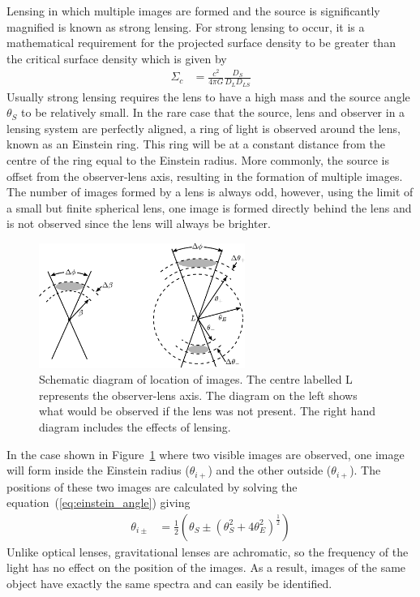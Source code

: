 		Lensing in which multiple images are formed and the source is significantly magnified is known as strong lensing. For strong lensing to occur, it is a mathematical requirement for the projected surface density to be greater than the critical surface density which is given by\cite{Critical_surface_density}
		\begin{align}
			\Sigma_c &= \frac{c^2}{4\pi G}\frac{D_S}{D_L D_{LS}}
		\end{align}
		Usually strong lensing requires the lens to have a high mass and the source angle $\theta_S$ to be relatively small. In the rare case that the source, lens and observer in a lensing system are perfectly aligned, a ring of light is observed around the lens, known as an Einstein ring. This ring will be at a constant distance from the centre of the ring equal to the Einstein radius. More commonly, the source is offset from the observer-lens axis, resulting in the formation of multiple images. The number of images formed by a lens is always odd, however, using the limit of a small but finite spherical lens, one image is formed directly behind the lens and is not observed since the lens will always be brighter.
		\begin{figure}[!htbp]
			\centering
				\includegraphics[width=0.6\textwidth]{../Images/Lensing_image_positions2.pdf}
				\caption[Schematic diagram of location of images]{Schematic diagram of location of images. The centre labelled L represents the observer-lens axis. The diagram on the left shows what would be observed if the lens was not present. The right hand diagram includes the effects of lensing\cite{Hartle}.\label{fig:Lensing_image_positions2}}
		\end{figure}

		In the case shown in Figure~\ref{fig:Lensing_image_positions2} where two visible images are observed, one image will form inside the Einstein radius ($\theta_{i+}$) and the other outside ($\theta_{i+}$). The positions of these two images are calculated by solving the equation~(\ref{eq:einstein_angle}) giving
		\begin{align}
			\theta_{i\pm} &= \frac{1}{2}\left( \theta_S \pm {(\theta_S^2 + 4\theta_E^2)} ^{\frac{1}{2}} \right) \label{eq:image_position}
		\end{align}
		Unlike optical lenses, gravitational lenses are achromatic, so the frequency of the light has no effect on the position of the images. As a result, images of the same object have exactly the same spectra and can easily be identified\cite{Hartle}.

